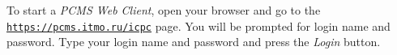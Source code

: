 To start a \emph{PCMS Web Client}, open your browser and go to the
\underline{\texttt{https://pcms.itmo.ru/icpc}} page.
You will be prompted for login name and password. Type your login
name and password and press the \emph{Login} button.
